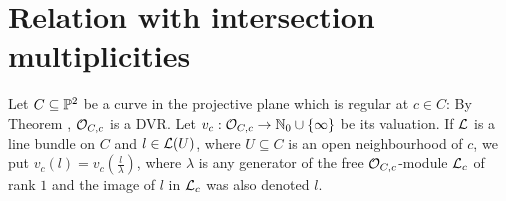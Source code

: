 \documentclass[a4paper,parskip=half,numbers=enddot, DIV=12]{scrreprt}
\begin{document}



\section{Relation with intersection multiplicities}Let $C\subseteq \mathbb{P}^2$ be a curve in the projective plane which is regular at $c\in C$:
By Theorem , $\mathcal{O}_{C,c}$ is a DVR. Let $v_c : \mathcal{O}_{C,c} \rightarrow\mathbb{N}_0\cup\{\infty\}$ be its valuation.
If $\mathcal{L}$ is a line bundle on $C$ and $l\in \mathcal{L}(U)$, where
$U\subseteq C$ is an open neighbourhood of $c$, we put $v_c(l) = v_c\left(\frac l\lambda\right)$, where $\lambda$
is any generator of the free $\mathcal{O}_{C,c}$-module $\mathcal{L}_c$ of rank $1$ and the image of $l$ in $\mathcal{L}_c$ was also denoted $l$.
\end{document}
